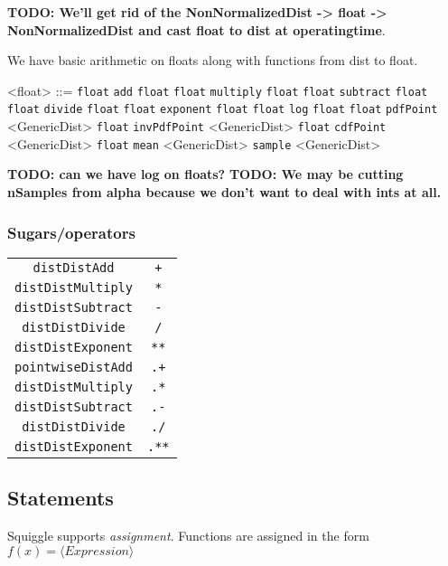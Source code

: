 \documentclass[../main.tex]{subfiles}
\begin{document}
\textbf{TODO: We'll get rid of the NonNormalizedDist -> float -> NonNormalizedDist and cast float to dist at operatingtime}.

We have basic arithmetic on floats along with functions from dist to float.
\begin{grammar}
  <float> ::=
    \texttt{float}
    \alt \texttt{add} \texttt{float} \texttt{float}
    \alt \texttt{multiply} \texttt{float} \texttt{float}
    \alt \texttt{subtract} \texttt{float} \texttt{float}
    \alt \texttt{divide} \texttt{float} \texttt{float}
    \alt \texttt{exponent} \texttt{float} \texttt{float}
    \alt \texttt{log} \texttt{float} \texttt{float}
    \alt \texttt{pdfPoint} <GenericDist> \texttt{float}
    \alt \texttt{invPdfPoint} <GenericDist> \texttt{float}
    \alt \texttt{cdfPoint} <GenericDist> \texttt{float}
    \alt \texttt{mean} <GenericDist>
    \alt \texttt{sample} <GenericDist>
\end{grammar}\label{gram:float}

\textbf{TODO: can we have log on floats?}
\textbf{TODO: We may be cutting nSamples from alpha because we don't want to deal with ints at all.}

\subsubsection{Sugars/operators}
\begin{tabular}{ c c }
  \texttt{distDistAdd} & \texttt{+} \\
  \texttt{distDistMultiply} & \texttt{*} \\
  \texttt{distDistSubtract} & \texttt{-} \\
  \texttt{distDistDivide} & \texttt{/} \\
  \texttt{distDistExponent} & \texttt{**} \\
  \texttt{pointwiseDistAdd} & \texttt{.+} \\
  \texttt{distDistMultiply} & \texttt{.*} \\
  \texttt{distDistSubtract} & \texttt{.-} \\
  \texttt{distDistDivide} & \texttt{./} \\
  \texttt{distDistExponent} & \texttt{.**}
\end{tabular}\label{sugar}

\subsection{Statements}
Squiggle supports \textit{assignment}. Functions are assigned in the form $f(x) = \langle \textit{Expression} \rangle$
\end{document}
